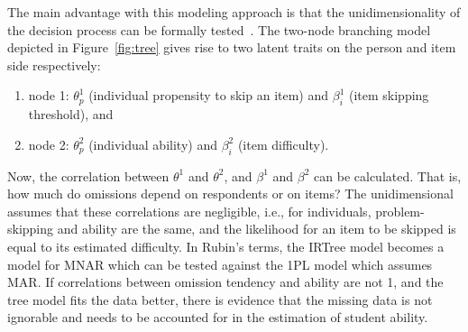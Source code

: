 \documentclass[manuscript]{acmart}
\begin{document}
The main advantage with this modeling approach is that the unidimensionality of the decision process can be formally tested~\cite{de2012irtrees}. The two-node branching model depicted in Figure~\ref{fig:tree} gives rise to two latent traits on the person and item side respectively: 
\begin{enumerate}
    \item node 1: $\theta_p^1$ (individual propensity to skip an item) and $\beta_i^1$ (item skipping threshold), and 
    \item node 2: $\theta_p^2$ (individual ability) and $\beta_i^2$ (item difficulty).
\end{enumerate}
Now, the correlation between $\theta^1$ and $\theta^2$, and $\beta^1$ and $\beta^2$ can be calculated. That is, how much do omissions depend on respondents or on items? The unidimensional assumes that these correlations are negligible, i.e., for individuals, problem-skipping and ability are the same, and the likelihood for an item to be skipped is equal to its estimated difficulty. In Rubin's \cite{rubin1976inference} terms, the IRTree model becomes a model for MNAR which can be tested against the 1PL model which assumes MAR. If correlations between omission tendency and ability are not 1, and the tree model fits the data better, there is evidence that the missing data is not ignorable and needs to be accounted for in the estimation of student ability. 
\end{document}
